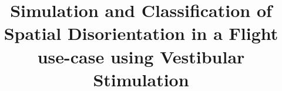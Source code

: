 \documentclass[11pt, onecolumn]{article}
\begin{document}

\title{Simulation and Classification of Spatial Disorientation in a Flight use-case using Vestibular Stimulation}


\end{document}
